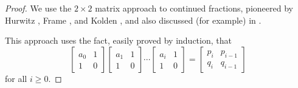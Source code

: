 \documentclass[12pt,reqno]{article}
\begin{document}
\begin{proof}
We use the $2\times 2$ matrix approach to continued fractions,
pioneered by Hurwitz \cite{Hurwitz&Kritikos:1986}, Frame \cite{Frame:1949}, and Kolden \cite{Kolden:1949}, and also discussed (for example)
in \cite{Allouche&Shallit:2003}.

This approach uses the fact, easily proved by induction, that
\begin{equation}
\left[ \begin{array}{cc} a_0 & 1 \\ 1 & 0  \end{array} \right]
\left[ \begin{array}{cc} a_1 & 1 \\ 1 & 0  \end{array} \right]
\cdots
\left[ \begin{array}{cc} a_i & 1 \\ 1 & 0  \end{array} \right] =
\left[ \begin{array}{cc} p_i & p_{i-1} \\ q_i & q_{i-1}  \end{array}\right] 
\label{hur}
\end{equation}
for all $i \geq 0$.


\end{proof}
\end{document}
